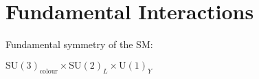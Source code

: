 \section{Fundamental Interactions}

Fundamental symmetry of the SM:

$\mathrm{SU}(3)_{\text{colour}} \times \mathrm{SU}(2)_L \times \mathrm{U}(1)_Y$

